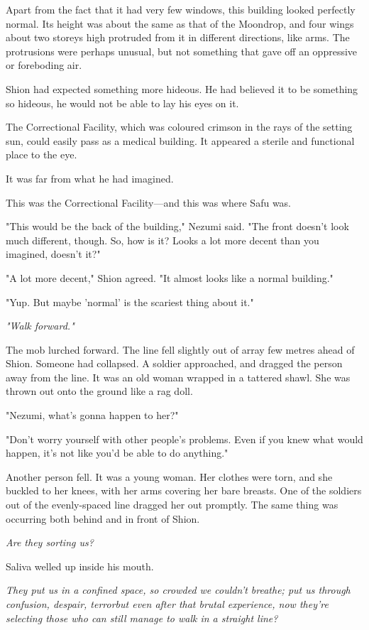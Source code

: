 Apart from the fact that it had very few windows, this building looked
perfectly normal. Its height was about the same as that of the Moondrop,
and four wings about two storeys high protruded from it in different
directions, like arms. The protrusions were perhaps unusual, but not
something that gave off an oppressive or foreboding air.

Shion had expected something more hideous. He had believed it to be
something so hideous, he would not be able to lay his eyes on it.~

The Correctional Facility, which was coloured crimson in the rays of the
setting sun, could easily pass as a medical building. It appeared a
sterile and functional place to the eye.

It was far from what he had imagined.

This was the Correctional Facility---and this was where Safu was.

"This would be the back of the building," Nezumi said. "The front
doesn't look much different, though. So, how is it? Looks a lot more
decent than you imagined, doesn't it?"

"A lot more decent," Shion agreed. "It almost looks like a normal
building."

"Yup. But maybe 'normal' is the scariest thing about it."

\emph{"Walk forward."}

The mob lurched forward. The line fell slightly out of array few metres
ahead of Shion. Someone had collapsed. A soldier approached, and dragged
the person away from the line. It was an old woman wrapped in a tattered
shawl. She was thrown out onto the ground like a rag doll.

"Nezumi, what's gonna happen to her?"

"Don't worry yourself with other people's problems. Even if you knew
what would happen, it's not like you'd be able to do anything."

Another person fell. It was a young woman. Her clothes were torn, and
she buckled to her knees, with her arms covering her bare breasts. One
of the soldiers out of the evenly-spaced line dragged her out promptly.
The same thing was occurring both behind and in front of Shion.

\emph{Are they sorting us?}

Saliva welled up inside his mouth.

\emph{They put us in a confined space, so crowded we couldn't breathe;
put us through confusion, despair, terror\el but even after that brutal
experience, now they're selecting those who can still manage to walk in
a straight line?}

